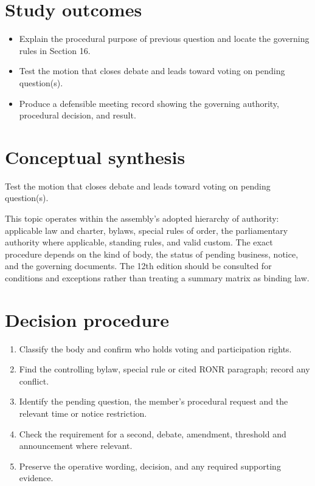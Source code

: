 \documentclass[11pt]{article}
\begin{document}
\SuiteOpen
{}
\section{Study outcomes}
\begin{itemize}[leftmargin=*,itemsep=4pt]
\item Explain the procedural purpose of previous question and locate the governing rules in Section 16.
\item Test the motion that closes debate and leads toward voting on pending question(s).
\item Produce a defensible meeting record showing the governing authority, procedural decision, and result.
\end{itemize}

\section{Conceptual synthesis}
Test the motion that closes debate and leads toward voting on pending question(s).

This topic operates within the assembly’s adopted hierarchy of authority: applicable law and charter, bylaws, special rules of order, the parliamentary authority where applicable, standing rules, and valid custom. The exact procedure depends on the kind of body, the status of pending business, notice, and the governing documents. The 12th edition should be consulted for conditions and exceptions rather than treating a summary matrix as binding law.
\section{Decision procedure}
\begin{enumerate}[leftmargin=*,itemsep=4pt]
\item Classify the body and confirm who holds voting and participation rights.
\item Find the controlling bylaw, special rule or cited RONR paragraph; record any conflict.
\item Identify the pending question, the member’s procedural request and the relevant time or notice restriction.
\item Check the requirement for a second, debate, amendment, threshold and announcement where relevant.
\item Preserve the operative wording, decision, and any required supporting evidence.
\end{enumerate}
\end{document}
